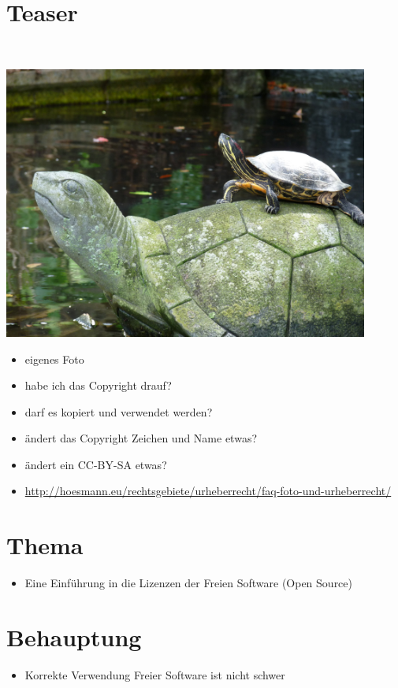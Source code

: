 
\section{Teaser}
\begin{frame}
	\\
	\visible<4->{ CC-BY-SA}
	\begin{center}
		\includegraphics[width=0.9\textwidth]{res/turtles.jpg}
	\end{center}
\end{frame}
\note
{
	\begin{itemize}
		\item eigenes Foto
		\item habe ich das Copyright drauf?
		\item darf es kopiert und verwendet werden?
		\item ändert das Copyright Zeichen und Name etwas?
		\item ändert ein CC-BY-SA etwas?
		\item \url{http://hoesmann.eu/rechtsgebiete/urheberrecht/faq-foto-und-urheberrecht/}
	\end{itemize}
}

\section{Thema}
\note
{
	\begin{itemize}
		\item Eine Einführung in die Lizenzen der Freien Software (Open Source)
	\end{itemize}
}

\section{Behauptung}
\note
{
	\begin{itemize}
		\item Korrekte Verwendung Freier Software ist nicht schwer
	\end{itemize}
}
